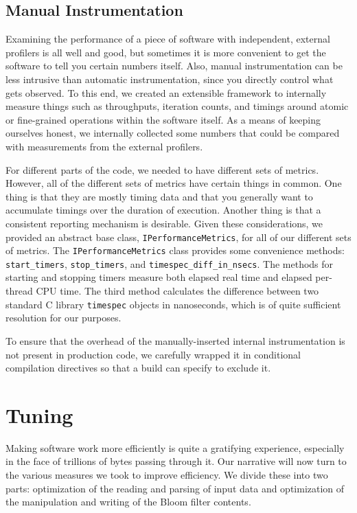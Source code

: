 \documentclass{article}
\begin{document}
\subsection{Manual Instrumentation}


Examining the performance of a piece of software with independent, external
profilers is all well and good, but sometimes it is more convenient to get the
software to tell you certain numbers itself. Also, manual instrumentation can
be less intrusive than automatic instrumentation, since you directly control
what gets observed. To this end, we created an extensible framework to
internally measure things such as throughputs, iteration counts, and timings
around atomic or fine-grained operations within the software itself. As a means
of keeping ourselves honest, we internally collected some numbers that could be
compared with measurements from the external profilers.

For different parts of the code, we needed to have different sets of metrics.
However, all of the different sets of metrics have certain things in common.
One thing is that they are mostly timing data and that you generally want to
accumulate timings over the duration of execution. Another thing is that a
consistent reporting mechanism is desirable. Given these considerations, we
provided an abstract base class, \texttt{IPerformanceMetrics}, for all of our
different sets of metrics. The \texttt{IPerformanceMetrics} class provides some
convenience methods: \texttt{start\_timers}, \texttt{stop\_timers}, and
\texttt{timespec\_diff\_in\_nsecs}. The methods for starting and stopping
timers measure both elapsed real time and elapsed per-thread CPU time. The
third method calculates the difference between two standard C library
\texttt{timespec} objects in nanoseconds, which is of quite sufficient
resolution for our purposes.

To ensure that the overhead of the manually-inserted internal instrumentation
is not present in production code, we carefully wrapped it in conditional
compilation directives so that a build can specify to exclude it.

\section{Tuning}

Making software work more efficiently is quite a gratifying experience,
especially in the face of trillions of bytes passing through it. Our narrative
will now turn to the various measures we took to improve efficiency. We
divide these into two parts: optimization of the reading and parsing of input
data and optimization of the manipulation and writing of the Bloom filter
contents.
\end{document}
